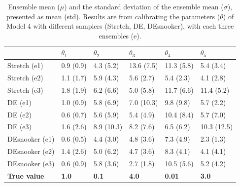 \clearpage

\begin{table}[ht]
\caption{Ensemble mean ($\mu$) and the standard deviation of the ensemble mean ($\sigma$), presented as mean (std). Results are from calibrating the parameters ($\theta$) of Model 4 with different samplers (Stretch, DE, DEsnooker), with each three ensembles (e).}
\label{tab_logbook_1.2_mean4}
\begin{tabularx}{\textwidth}{lXXXXX}
\toprule
 & $\theta_1$ & $\theta_2$ & $\theta_3$ & $\theta_4$ & $\theta_5$ \\
\midrule
Stretch (e1) & 0.9 (0.9) & 4.3 (5.2) & 13.6 (7.5) & 11.3 (5.8) & 5.4 (3.4) \\
Stretch (e2) & 1.1 (1.7) & 5.9 (4.3) & 5.6 (2.7) & 5.4 (2.3) & 4.1 (2.8) \\
Stretch (e3) & 1.8 (1.9) & 6.2 (6.6) & 5.0 (5.8) & 11.7 (6.6) & 11.4 (5.2) \\
\midrule
DE (e1) & 1.0 (0.9) & 5.8 (6.9) & 7.0 (10.3) & 9.8 (9.8) & 5.7 (2.2) \\
DE (e2) & 0.6 (0.7) & 5.6 (5.9) & 5.4 (4.9) & 10.4 (8.4) & 5.7 (7.0) \\
DE (e3) & 1.6 (2.6) & 8.9 (10.3) & 8.2 (7.6) & 6.5 (6.2) & 10.3 (12.5) \\
\midrule
DEsnooker (e1) & 0.6 (0.5) & 4.4 (3.0) & 4.8 (3.6) & 7.3 (4.9) & 2.3 (1.3) \\
DEsnooker (e2) & 1.4 (2.6) & 5.0 (6.2) & 4.7 (3.6) & 8.3 (4.1) & 4.1 (4.1) \\
DEsnooker (e3) & 0.6 (0.9) & 5.8 (3.6) & 2.7 (1.8) & 10.5 (5.6) & 5.2 (4.2) \\
\midrule
\textbf{True value} & \textbf{1.0} & \textbf{0.1} & \textbf{4.0} & \textbf{0.01} & \textbf{3.0} \\
\bottomrule
\end{tabularx}
\end{table}

